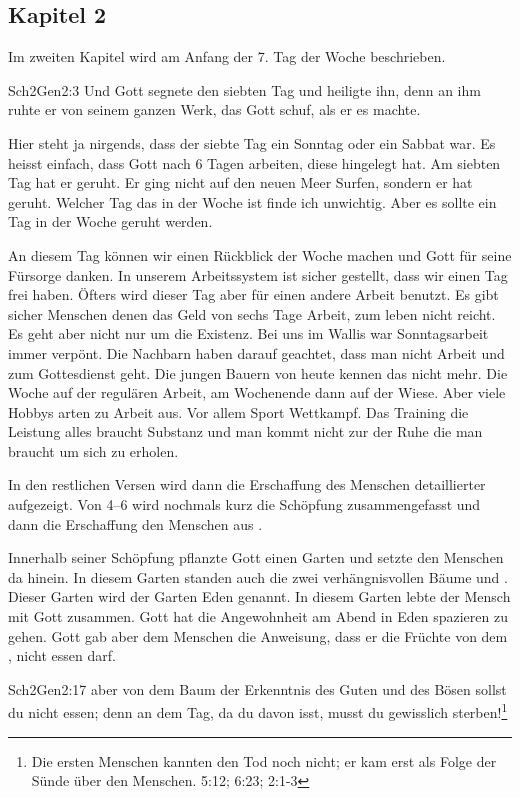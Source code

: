 
\subsection{Kapitel 2}
Im zweiten Kapitel wird am Anfang der 7. Tag der Woche beschrieben.
\begin{bibeltext}{Sch2}{Gen}{2:3}
	Und Gott segnete den siebten Tag und heiligte ihn, denn an ihm ruhte er von seinem ganzen Werk, das Gott schuf, als er es machte.
\end{bibeltext}
Hier steht ja nirgends, dass der siebte Tag ein Sonntag oder ein Sabbat war. Es heisst einfach, dass Gott nach 6 Tagen arbeiten, diese hingelegt hat. Am siebten Tag hat er geruht. Er ging nicht auf den neuen Meer Surfen, sondern er hat geruht. Welcher Tag das in der Woche ist finde ich unwichtig. Aber es sollte ein Tag in der Woche geruht werden.

An diesem Tag können wir einen Rückblick der Woche machen und Gott für seine Fürsorge danken. In unserem Arbeitssystem ist sicher gestellt, dass wir einen Tag frei haben. Öfters wird dieser Tag aber für einen andere Arbeit benutzt. Es gibt sicher Menschen denen das Geld von sechs Tage Arbeit, zum leben nicht reicht. Es geht aber nicht nur um die Existenz. Bei uns im Wallis war Sonntagsarbeit immer verpönt. Die Nachbarn haben darauf geachtet, dass man nicht Arbeit und zum Gottesdienst geht. Die jungen Bauern von heute kennen das nicht mehr. Die Woche auf der regulären Arbeit, am Wochenende dann auf der Wiese. Aber viele Hobbys arten zu Arbeit aus. Vor allem Sport Wettkampf. Das Training die Leistung alles braucht Substanz und man kommt nicht zur der Ruhe die man braucht um sich zu erholen.

In den restlichen Versen wird dann die Erschaffung des Menschen detaillierter aufgezeigt. Von 4--6 wird nochmals kurz die Schöpfung zusammengefasst und dann die Erschaffung den Menschen aus .

Innerhalb seiner Schöpfung pflanzte Gott einen Garten und setzte den Menschen da hinein. In diesem Garten standen auch die zwei verhängnisvollen Bäume  und . Dieser Garten wird der Garten Eden genannt. In diesem Garten lebte der Mensch mit Gott zusammen. Gott hat die Angewohnheit am Abend in Eden spazieren zu gehen. Gott gab aber dem Menschen die Anweisung, dass er die Früchte von dem , nicht essen darf.
\begin{bibeltext}{Sch2}{Gen}{2:17}
	aber von dem Baum der Erkenntnis des Guten und des Bösen sollst du nicht essen; denn an dem Tag, da du davon isst, musst du gewisslich sterben!\footnote{Die ersten Menschen kannten den Tod noch nicht; er kam erst als Folge der Sünde über den Menschen.  {5:12};  {6:23};  {2:1-3}}
\end{bibeltext}

